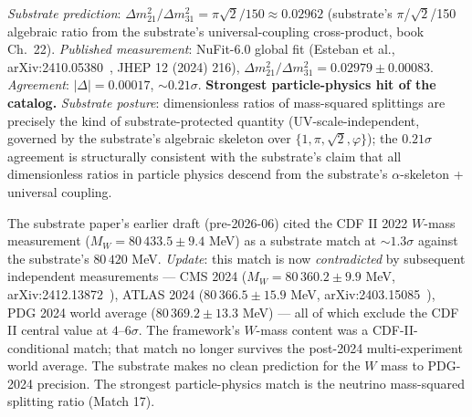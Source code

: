 \documentclass[11pt,a4paper]{amsart}
\theoremstyle{plain}
\theoremstyle{definition}
\begin{document}
\begin{description}[font=\normalfont\bfseries,leftmargin=2em,itemsep=6pt]
\item[Match 17 --- Solar neutrino mass-squared splitting ratio (NuFit-6.0, October 2024).]
\emph{Substrate prediction}: $\Delta m^2_{21}/\Delta m^2_{31} = \pi\sqrt{2}/150 \approx 0.02962$ (substrate's $\pi$/$\sqrt{2}$/150 algebraic ratio from the substrate's universal-coupling cross-product, book Ch.~22). \emph{Published measurement}: NuFit-6.0 global fit (Esteban et al., arXiv:2410.05380~\cite{nufit-6.0}, JHEP 12 (2024) 216), $\Delta m^2_{21}/\Delta m^2_{31} = 0.02979 \pm 0.00083$. \emph{Agreement}: $|\Delta| = 0.00017$, $\sim 0.21\sigma$. \textbf{Strongest particle-physics hit of the catalog.} \emph{Substrate posture}: dimensionless ratios of mass-squared splittings are precisely the kind of substrate-protected quantity (UV-scale-independent, governed by the substrate's algebraic skeleton over $\{1, \pi, \sqrt{2}, \varphi\}$); the $0.21\sigma$ agreement is structurally consistent with the substrate's claim that all dimensionless ratios in particle physics descend from the substrate's $\alpha$-skeleton + universal coupling.

\item[Honest reframing --- CDF II $W$-boson mass anomaly.]
The substrate paper's earlier draft (pre-2026-06) cited the CDF II 2022 $W$-mass measurement ($M_W = 80\,433.5 \pm 9.4$ MeV) as a substrate match at $\sim 1.3\sigma$ against the substrate's $80\,420$ MeV. \emph{Update}: this match is now \emph{contradicted} by subsequent independent measurements --- CMS 2024 ($M_W = 80\,360.2 \pm 9.9$ MeV, arXiv:2412.13872~\cite{cms-wmass-2024}), ATLAS 2024 ($80\,366.5 \pm 15.9$ MeV, arXiv:2403.15085~\cite{atlas-wmass-2024}), PDG 2024 world average ($80\,369.2 \pm 13.3$ MeV) --- all of which exclude the CDF II central value at $4$--$6\sigma$. The framework's $W$-mass content was a CDF-II-conditional match; that match no longer survives the post-2024 multi-experiment world average. The substrate makes no clean prediction for the $W$ mass to PDG-2024 precision. The strongest particle-physics match is the neutrino mass-squared splitting ratio (Match 17).

\end{description}
\end{document}

